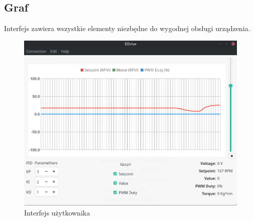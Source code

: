     \subsection{Graf}
    Interfejs zawiera wszystkie elementy niezbędne do wygodnej obsługi urządzenia.
    
    \begin{figure}[ht]
        \centering
        \includegraphics[width=1\textwidth]{img/app_ui.png}
        \caption{Interfejs użytkownika}
        \label{fig:app_ui}
    \end{figure}